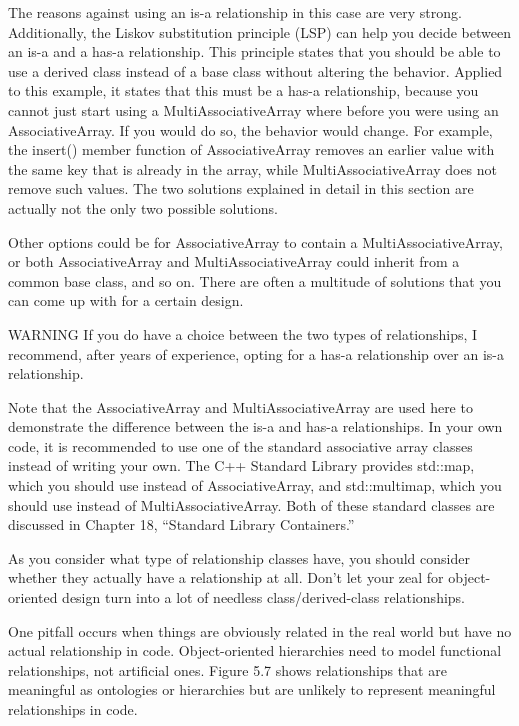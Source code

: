 The reasons against using an is-a relationship in this case are very strong. Additionally, the Liskov substitution principle (LSP) can help you decide between an is-a and a has-a relationship. This principle states that you should be able to use a derived class instead of a base class without altering the behavior. Applied to this example, it states that this must be a has-a relationship, because you cannot just start using a MultiAssociativeArray where before you were using an AssociativeArray. If you would do so, the behavior would change. For example, the insert() member function of AssociativeArray removes an earlier value with the same key that is already in the array, while MultiAssociativeArray does not remove such values.
The two solutions explained in detail in this section are actually not the only two possible solutions.

Other options could be for AssociativeArray to contain a MultiAssociativeArray, or both AssociativeArray and MultiAssociativeArray could inherit from a common base class, and so on. There are often a multitude of solutions that you can come up with for a certain design.

\begin{myWarning}{WARNING}
If you do have a choice between the two types of relationships, I recommend, after years of experience, opting for a has-a relationship over an is-a relationship.
\end{myWarning}

Note that the AssociativeArray and MultiAssociativeArray are used here to demonstrate the difference between the is-a and has-a relationships. In your own code, it is recommended to use one of the standard associative array classes instead of writing your own. The C++ Standard Library provides std::map, which you should use instead of AssociativeArray, and std::multimap, which you should use instead of MultiAssociativeArray. Both of these standard classes are discussed in Chapter 18, “Standard Library Containers.”


As you consider what type of relationship classes have, you should consider whether they actually have a relationship at all. Don’t let your zeal for object-oriented design turn into a lot of needless class/derived-class relationships.

One pitfall occurs when things are obviously related in the real world but have no actual relationship in code. Object-oriented hierarchies need to model functional relationships, not artificial ones. Figure 5.7 shows relationships that are meaningful as ontologies or hierarchies but are unlikely to represent meaningful relationships in code.


